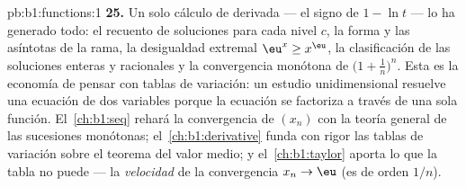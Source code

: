 \begin{solution}{pb:b1:functions:1}
\textbf{25.} Un solo cálculo de derivada --- el signo de $1 - \ln t$ ---
lo ha generado todo: el recuento de soluciones para cada nivel $c$, la
forma y las asíntotas de la rama, la desigualdad extremal
$\eu^x \geq x^\eu$, la clasificación de las soluciones enteras y
racionales y la convergencia monótona de $\bigl(1 + \frac1n\bigr)^n$.
Esta es la economía de pensar con tablas de variación: un estudio
unidimensional resuelve una ecuación de dos variables porque la
ecuación se factoriza a través de una sola función.
El~\cref{ch:b1:seq} rehará la convergencia de $(x_n)$ con la teoría
general de las sucesiones monótonas; el~\cref{ch:b1:derivative} funda
con rigor las tablas de variación sobre el teorema del valor medio; y
el~\cref{ch:b1:taylor} aporta lo que la tabla no puede --- la
\emph{velocidad} de la convergencia $x_n \to \eu$ (es de orden $1/n$).
\end{solution}
